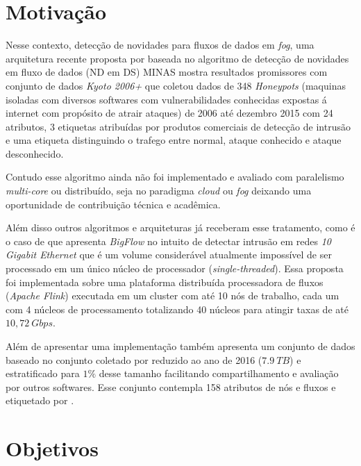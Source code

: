 \section{Motivação}

Nesse contexto, detecção de novidades para fluxos de dados em \emph{fog}, uma
arquitetura recente proposta por  baseada no algoritmo
de detecção de novidades em fluxo de dados (ND em DS) MINAS
\cite{Faria2016minas} mostra resultados promissores com conjunto de dados
\emph{Kyoto 2006+} que coletou dados de 348 \emph{Honeypots} (maquinas isoladas
com diversos softwares com vulnerabilidades conhecidas expostas á internet com
propósito de atrair ataques) de 2006 até dezembro 2015 com 24 atributos, 3
etiquetas atribuídas por produtos comerciais de detecção de intrusão e uma etiqueta
distinguindo o trafego entre normal, ataque conhecido e ataque desconhecido.

Contudo esse algoritmo
ainda não foi implementado e avaliado com paralelismo \emph{multi-core} ou
distribuído, seja no paradigma \emph{cloud} ou \emph{fog} deixando uma
oportunidade de contribuição técnica e acadêmica.

Além disso outros algoritmos e arquiteturas já receberam esse tratamento, como é
o caso de  que apresenta \emph{BigFlow} no intuito de
detectar intrusão em redes \emph{10 Gigabit Ethernet} que é um volume
considerável atualmente impossível de ser processado em um único núcleo de
processador (\emph{single-threaded}). Essa proposta foi implementada sobre uma
plataforma distribuída processadora de fluxos (\emph{Apache Flink}) executada em
um cluster com até 10 nós de trabalho, cada um com 4 núcleos de processamento
totalizando 40 núcleos para atingir taxas de até $10,72 \  Gbps$.

Além de apresentar uma implementação  também apresenta um
conjunto de dados baseado no conjunto coletado por 
\cite{Fontugne2010} reduzido ao ano de 2016 ($7.9 \ TB$) e estratificado para
$1\%$ desse tamanho facilitando compartilhamento e avaliação por outros
softwares. Esse conjunto contempla 158 atributos de nós e fluxos e etiquetado
por .

\section{Objetivos}

% 

